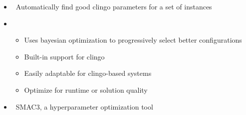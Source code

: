\begin{frame}{\acclingo}
  \begin{itemize}
    \item {} \ Automatically find good clingo parameters for a set of instances
    \item {} \
      \begin{itemize}
        \item Uses bayesian optimization to progressively select better configurations
        \item Built-in support for clingo
        \item Easily adaptable for clingo-based systems
        \item Optimize for runtime or solution quality
      \end{itemize}
    \item {} \ SMAC3, a hyperparameter optimization tool
    \end{itemize}
  \end{frame}
%
